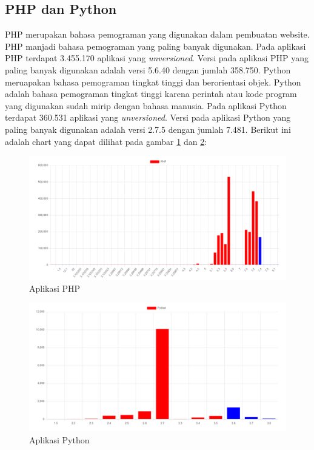 \subsection{PHP dan Python}
PHP merupakan bahasa pemograman yang digunakan dalam pembuatan website. PHP manjadi bahasa pemograman yang paling banyak digunakan. Pada aplikasi PHP terdapat 3.455.170 aplikasi yang \textit{unversioned}. Versi pada aplikasi PHP yang paling banyak digunakan adalah versi 5.6.40 dengan jumlah 358.750.
Python meruapakan bahasa pemograman tingkat tinggi dan berorientasi objek. Python adalah bahasa pemograman tingkat tinggi karena perintah atau kode program yang digunakan sudah mirip dengan bahasa manusia. Pada aplikasi Python terdapat 360.531 aplikasi yang \textit{unversioned}. Versi pada aplikasi Python yang paling banyak digunakan adalah versi 2.7.5 dengan jumlah 7.481. Berikut ini adalah chart yang dapat dilihat pada gambar \ref{fig:data_sample_php} dan \ref{fig:data_sample_python}:
\begin{figure}[H]
	\centering  
	\includegraphics[scale=0.4]{Gambar/data_sample_php.png}  
	\caption{Aplikasi PHP} 
	\label{fig:data_sample_php} 
\end{figure}

\begin{figure}[H]
	\centering  
	\includegraphics[scale=0.4]{Gambar/data_sample_python.png}  
	\caption{Aplikasi Python} 
	\label{fig:data_sample_python} 
\end{figure}

